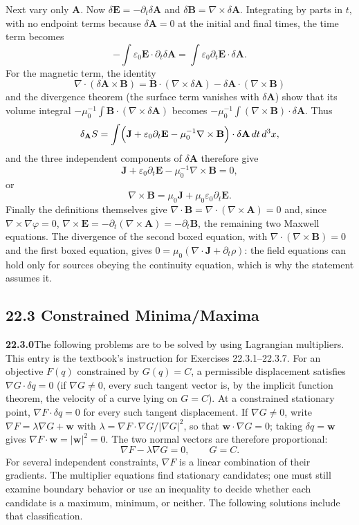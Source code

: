 Next vary only $\mathbf A$. Now
$\delta\mathbf E=-\partial_t\delta\mathbf A$ and
$\delta\mathbf B=\nabla\times\delta\mathbf A$. Integrating by parts
in $t$, with no endpoint terms because $\delta\mathbf A=0$ at the
initial and final times, the time term becomes
\[
-\int\varepsilon_0\mathbf E\cdot\partial_t\delta\mathbf A
=\int\varepsilon_0\partial_t\mathbf E\cdot\delta\mathbf A.
\]
For the magnetic term, the identity
\[
\nabla\cdot(\delta\mathbf A\times\mathbf B)
=\mathbf B\cdot(\nabla\times\delta\mathbf A)
-\delta\mathbf A\cdot(\nabla\times\mathbf B)
\]
and the divergence theorem (the surface term vanishes with
$\delta\mathbf A$) show that its volume integral
$-\mu_0^{-1}\int\mathbf B\cdot(\nabla\times\delta\mathbf A)$ becomes
$-\mu_0^{-1}\int(\nabla\times\mathbf B)\cdot\delta\mathbf A$. Thus
\[
\delta_{\mathbf A}S=\int\Bigl(\mathbf J+\varepsilon_0\partial_t\mathbf E
-\mu_0^{-1}\nabla\times\mathbf B\Bigr)\cdot\delta\mathbf A\,dt\,d^3x,
\]
and the three independent components of $\delta\mathbf A$ therefore give
\[
\mathbf J+\varepsilon_0\partial_t\mathbf E
-\mu_0^{-1}\nabla\times\mathbf B=0,
\]
or
\[
\boxed{\nabla\times\mathbf B
=\mu_0\mathbf J+\mu_0\varepsilon_0\partial_t\mathbf E}.
\]
Finally the definitions themselves give
$\nabla\cdot\mathbf B=\nabla\cdot(\nabla\times\mathbf A)=0$ and, since
$\nabla\times\nabla\varphi=0$,
$\nabla\times\mathbf E=-\partial_t(\nabla\times\mathbf A)
=-\partial_t\mathbf B$, the remaining two Maxwell equations.
The divergence of the second boxed equation, with
$\nabla\cdot(\nabla\times\mathbf B)=0$ and the first boxed equation,
gives $0=\mu_0(\nabla\cdot\mathbf J+\partial_t\rho)$: the field
equations can hold only for sources obeying the continuity equation,
which is why the statement assumes it.


\subsection*{22.3 Constrained Minima/Maxima}

\par\bigskip
\noindent\textbf{22.3.0}\quad The following problems are to be
solved by using Lagrangian multipliers.
\solution
This entry is the textbook's instruction for Exercises
22.3.1--22.3.7. For an objective $F(q)$ constrained by $G(q)=C$,
a permissible displacement satisfies $\nabla G\cdot\delta q=0$
(if $\nabla G\ne0$, every such tangent vector is, by the implicit
function theorem, the velocity of a curve lying on $G=C$).
At a constrained stationary point, $\nabla F\cdot\delta q=0$
for every such tangent displacement. If $\nabla G\ne0$, write
$\nabla F=\lambda\nabla G+\mathbf w$ with
$\lambda=\nabla F\cdot\nabla G/|\nabla G|^2$, so that
$\mathbf w\cdot\nabla G=0$; taking $\delta q=\mathbf w$ gives
$\nabla F\cdot\mathbf w=|\mathbf w|^2=0$. The two normal vectors are
therefore proportional:
\[
\boxed{\nabla F-\lambda\nabla G=0,\qquad G=C}.
\]
For several independent constraints, $\nabla F$ is a linear combination
of their gradients. The multiplier equations find stationary candidates;
one must still examine boundary behavior or use an inequality to decide
whether each candidate is a maximum, minimum, or neither. The following
solutions include that classification.


